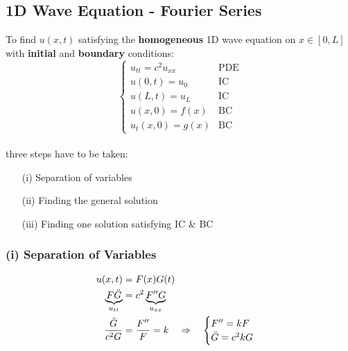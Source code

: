 \subsection{1D Wave Equation - Fourier Series}
To find $u(x,t)$ satisfying the \textbf{homogeneous} 1D wave equation on $x\in[0,L]$ with \textbf{initial} and
\textbf{boundary} conditions:
\begin{equation*}
    \begin{cases}
        u_{tt}=c^2u_{xx} & \text{PDE} \\
        u(0,t)=u_0       & \text{IC}  \\
        u(L,t)=u_L       & \text{IC}  \\
        u(x,0)=f(x)      & \text{BC}  \\
        u_t(x,0)=g(x)    & \text{BC}
    \end{cases}
\end{equation*}\\
three steps have to be taken:
\begin{itemize}
    \item[(i)] Separation of variables
    \item[(ii)] Finding the general solution
    \item[(iii)] Finding one solution satisfying IC \& BC
\end{itemize}
%
%

\subsubsection{(i) Separation of Variables}
\begin{align*}
    u(x,t)                          & =F(x)G(t)                                               \\
    \underbrace{F\ddot{G}}_{u_{tt}} & =c^2\underbrace{F''G}_{u_{xx}}                          \\
    \frac{\ddot{G}}{c^2G}           & =\frac{F''}{F}=k\hspace*{10pt}\Rightarrow\hspace*{10pt}
    \begin{cases}
        F''=kF \\
        \ddot{G}=c^2kG
    \end{cases}
\end{align*}
%
%
